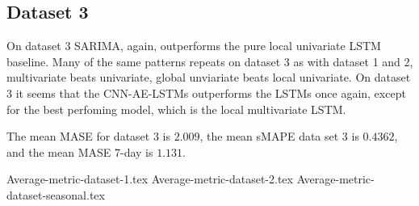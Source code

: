 \subsection{Dataset 3}
On dataset 3 SARIMA, again, outperforms the pure local univariate LSTM baseline.
Many of the same patterns repeats on dataset 3 as with dataset 1 and 2, multivariate beats univariate,
global unviariate beats local univariate.
On dataset 3 it seems that the CNN-AE-LSTMs outperforms the LSTMs once again, except for the
best perfoming model, which is the local multivariate LSTM.

The mean MASE for dataset 3 is $2.009$,
the mean sMAPE data set 3 is $0.4362$,
and the mean MASE 7-day is $1.131$.



{Average-metric-dataset-1.tex}
{Average-metric-dataset-2.tex}
{Average-metric-dataset-seasonal.tex}


